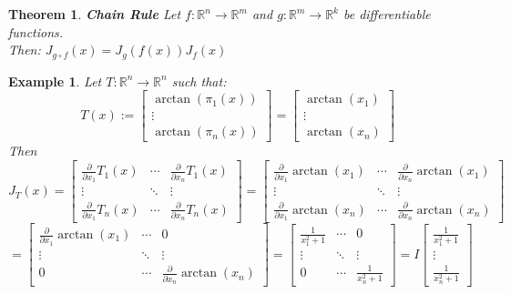 \documentclass[12pt]{extarticle}
\theoremstyle{plain}
\newtheorem{thm}{Theorem}[section]
\theoremstyle{Definition}
\theoremstyle{Definition}
\theoremstyle{plain}
\newtheorem{exmp}{Example}[section]
\begin{document}
\begin{thm} \textbf{Chain Rule}
	Let $f : \mathbb{R}^n \to \mathbb{R}^m$ and $g : \mathbb{R}^m \to \mathbb{R}^k$ be differentiable functions. \\ 
	Then: $J_{g \circ f}(x) = J_g(f(x))J_f(x)$ \\ 
\end{thm}

\begin{exmp} 
	Let $T : \mathbb{R}^n \to \mathbb{R}^n$ such that:
	\[
	T(x) := 
	\begin{bmatrix}
	\arctan(\pi_1(x)) \\ 
	\vdots \\ 
	\arctan(\pi_n(x))
	\end{bmatrix}
	= 
	\begin{bmatrix}
	\arctan(x_1) \\ 
	\vdots \\ 
	\arctan(x_n)
	\end{bmatrix}
	\]
	Then
	\[
	J_T(x) = 
	\begin{bmatrix} 
	\frac{\partial }{\partial x_1}T_1(x) & \cdots & \frac{\partial }{\partial x_n}T_1(x) \\
	\vdots & \ddots & \vdots \\ 
	\frac{\partial }{\partial x_1}T_n(x) & \cdots & \frac{\partial }{\partial x_n}T_n(x) 
	\end{bmatrix}
	=
	\begin{bmatrix} 
	\frac{\partial}{\partial x_1}\arctan(x_1) & \cdots & \frac{\partial}{\partial x_n}\arctan(x_1) \\
	\vdots & \ddots & \vdots \\ 
	\frac{\partial }{\partial x_1}\arctan(x_n) & \cdots & \frac{\partial }{\partial x_n}\arctan(x_n) 
	\end{bmatrix}	
	\]
	\[
	=
	\begin{bmatrix} 
	\frac{\partial}{\partial x_1}\arctan(x_1) & \cdots & 0 \\
	\vdots & \ddots & \vdots \\ 
	0 & \cdots & \frac{\partial }{\partial x_n}\arctan(x_n) 
	\end{bmatrix}								
	=
	\begin{bmatrix} 
	\frac{1}{x_1^2 + 1} & \cdots & 0 \\
	\vdots & \ddots & \vdots \\ 
	0 & \cdots & \frac{1}{x_n^2 + 1} 
	\end{bmatrix}								
	= I \begin{bmatrix}
	\frac{1}{x_1^2 + 1} \\ 
	\vdots \\
	\frac{1}{x_n^2 + 1}
	\end{bmatrix}
	\]
\end{exmp}
\end{document}
